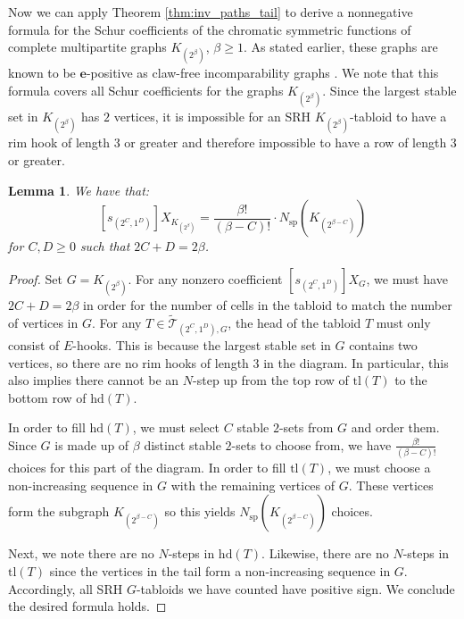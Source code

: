 \documentclass[12pt]{amsart}
\numberwithin{equation}{section}
\theoremstyle{plain}
\newtheorem{lemma}[equation]{Lemma}
\theoremstyle{definition}
\theoremstyle{remark}
\begin{document}
Now we can apply Theorem \ref{thm:inv_paths_tail} to derive a nonnegative formula for the Schur coefficients of the chromatic symmetric functions of complete multipartite graphs $K_{(2^{\beta})}$, $\beta\ge 1$. As stated earlier, these graphs are known to be $\textbf{e}$-positive as claw-free incomparability graphs \cite{hikita24}. We note that this formula covers all Schur coefficients for the graphs $K_{(2^{\beta})}$. Since the largest stable set in $K_{(2^{\beta})}$ has $2$ vertices, it is impossible for an SRH $K_{(2^{\beta})}$-tabloid to have a rim hook of length 3 or greater and therefore impossible to have a row of length 3 or greater.


\begin{lemma}
\label{lemma:form_two_partite_case}
We have that:
\[
[s_{(2^C,1^D)}]X_{K_{(2^{\beta})}}=\frac{\beta !}{(\beta-C)!}\cdot N_{\mathrm{sp}}(K_{(2^{\beta-C})})
\]
for $C,D\ge 0$ such that $2C+D=2\beta$.
\end{lemma}
\begin{proof}
Set $G=K_{(2^{\beta})}$. For any nonzero coefficient $[s_{(2^C,1^D)}]X_{G}$, we must have $2C+D=2\beta$ in order for the number of cells in the tabloid to match the number of vertices in $G$. For any $T\in \tilde{\mathcal{T}}_{(2^C,1^D),G}$, the head of the tabloid $T$ must only consist of $E$-hooks. This is because the largest stable set in $G$ contains two vertices, so there are no rim hooks of length $3$ in the diagram. In particular, this also implies there cannot be an $N$-step up from the top row of $\mathrm{tl}(T)$ to the bottom row of $\mathrm{hd}(T)$.


In order to fill $\mathrm{hd}(T)$, we must select $C$ stable $2$-sets from $G$ and order them. Since $G$ is made up of $\beta$ distinct stable $2$-sets to choose from, we have $\frac{\beta!}{(\beta-C)!}$ choices for this part of the diagram. In order to fill $\mathrm{tl}(T)$, we must choose a non-increasing sequence in $G$ with the remaining vertices of $G$. These vertices form the subgraph $K_{(2^{\beta-C})}$ so this yields $N_{\mathrm{sp}}(K_{(2^{\beta-C})})$ choices.


Next, we note there are no $N$-steps in $\mathrm{hd}(T)$. Likewise, there are no $N$-steps in $\mathrm{tl}(T)$ since the vertices in the tail form a non-increasing sequence in $G$. Accordingly, all SRH $G$-tabloids we have counted have positive sign. We conclude the desired formula holds.
\end{proof}
\end{document}
